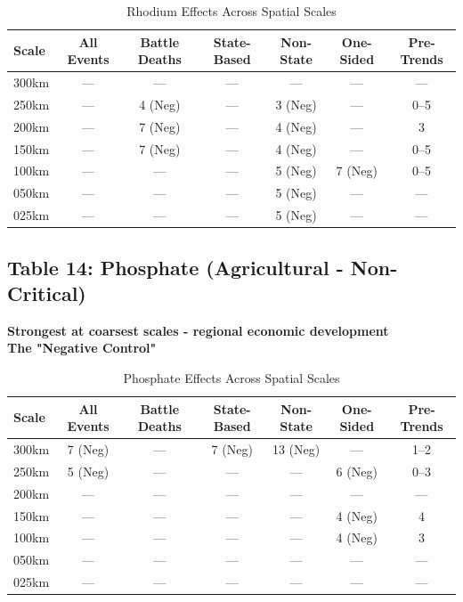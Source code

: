 \documentclass[11pt]{article}
\begin{document}
\begin{table}[H]
\centering
\caption{Rhodium Effects Across Spatial Scales}
\begin{tabular}{lcccccc}
\toprule
Scale & All Events & Battle Deaths & State-Based & Non-State & One-Sided & Pre-Trends \\
\midrule
300km & ---       & ---           & ---         & ---       & ---       & ---        \\
250km & ---       & 4 (Neg)       & ---         & 3 (Neg)   & ---       & 0--5       \\
200km & ---       & 7 (Neg)       & ---         & 4 (Neg)   & ---       & 3          \\
150km & ---       & 7 (Neg)       & ---         & 4 (Neg)   & ---       & 0--5       \\
100km & ---       & ---           & ---         & 5 (Neg)   & 7 (Neg)   & 0--5       \\
050km & ---       & ---           & ---         & 5 (Neg)   & ---       & ---        \\
025km & ---       & ---           & ---         & 5 (Neg)   & ---       & ---        \\
\bottomrule
\end{tabular}
\end{table}

\subsection{Table 14: Phosphate (Agricultural - Non-Critical)}

\textbf{Strongest at coarsest scales - regional economic development}\\
\textbf{The "Negative Control"}

\begin{table}[H]
\centering
\caption{Phosphate Effects Across Spatial Scales}
\begin{tabular}{lcccccc}
\toprule
Scale & All Events & Battle Deaths & State-Based & Non-State & One-Sided & Pre-Trends \\
\midrule
300km & 7 (Neg)   & ---           & 7 (Neg)     & 13 (Neg)  & ---       & 1--2       \\
250km & 5 (Neg)   & ---           & ---         & ---       & 6 (Neg)   & 0--3       \\
200km & ---       & ---           & ---         & ---       & ---       & ---        \\
150km & ---       & ---           & ---         & ---       & 4 (Neg)   & 4          \\
100km & ---       & ---           & ---         & ---       & 4 (Neg)   & 3          \\
050km & ---       & ---           & ---         & ---       & ---       & ---        \\
025km & ---       & ---           & ---         & ---       & ---       & ---        \\
\bottomrule
\end{tabular}
\end{table}
\end{document}
